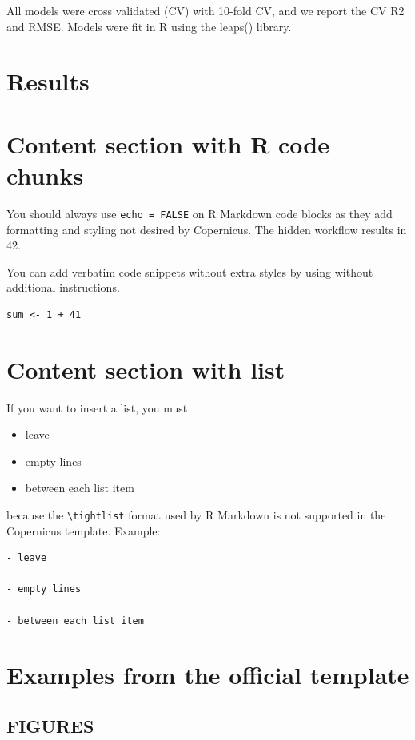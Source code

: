 \documentclass[, manuscript]{copernicus}
\begin{document}
All models were cross validated (CV) with 10-fold CV, and we report the
CV R2 and RMSE. Models were fit in R using the leaps() library.

\section{Results}

\section{Content section with R code chunks}

You should always use \texttt{echo\ =\ FALSE} on R Markdown code blocks
as they add formatting and styling not desired by Copernicus. The hidden
workflow results in 42.

You can add verbatim code snippets without extra styles by using
\texttt{\textasciigrave{}\textasciigrave{}\textasciigrave{}} without
additional instructions.

\begin{verbatim}
sum <- 1 + 41
\end{verbatim}

\section{Content section with list}

If you want to insert a list, you must

\begin{itemize}
\item
  leave
\item
  empty lines
\item
  between each list item
\end{itemize}

because the \texttt{\textbackslash{}tightlist} format used by R Markdown
is not supported in the Copernicus template. Example:

\begin{verbatim}
- leave

- empty lines

- between each list item
\end{verbatim}

\section{Examples from the official template}

\subsection{FIGURES}
\end{document}
